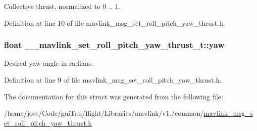 Collective thrust, normalized to 0 .. 1. 



Definition at line 10 of file mavlink\-\_\-msg\-\_\-set\-\_\-roll\-\_\-pitch\-\_\-yaw\-\_\-thrust.\-h.

\hypertarget{struct____mavlink__set__roll__pitch__yaw__thrust__t_a074887a2e921bb87f711b8cfbdcdb11d}{
\subsubsection[{yaw}]{\setlength{\rightskip}{0pt plus 5cm}float \-\_\-\-\_\-mavlink\-\_\-set\-\_\-roll\-\_\-pitch\-\_\-yaw\-\_\-thrust\-\_\-t\-::yaw}}\label{struct____mavlink__set__roll__pitch__yaw__thrust__t_a074887a2e921bb87f711b8cfbdcdb11d}


Desired yaw angle in radians. 



Definition at line 9 of file mavlink\-\_\-msg\-\_\-set\-\_\-roll\-\_\-pitch\-\_\-yaw\-\_\-thrust.\-h.



The documentation for this struct was generated from the following file\-:\begin{DoxyCompactItemize}
\item 
/home/jose/\-Code/gui\-Tau/flight/\-Libraries/mavlink/v1./common/\hyperlink{mavlink__msg__set__roll__pitch__yaw__thrust_8h}{mavlink\-\_\-msg\-\_\-set\-\_\-roll\-\_\-pitch\-\_\-yaw\-\_\-thrust.\-h}\end{DoxyCompactItemize}
